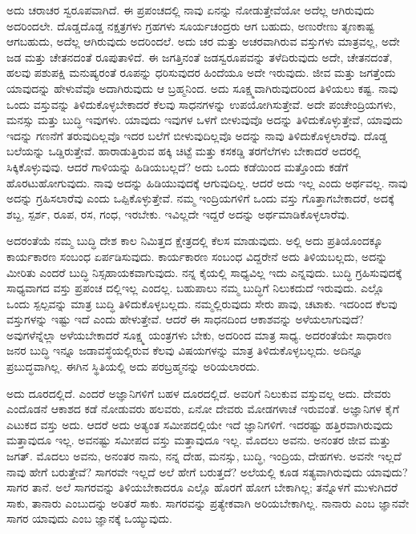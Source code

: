 ಅದು ಚರಾಚರ ಸ್ವರೂಪವಾಗಿದೆ. ಈ ಪ್ರಪಂಚದಲ್ಲಿ ನಾವು ಏನನ್ನು ನೋಡುತ್ತೇವೆಯೋ ಅದೆಲ್ಲ ಆಗಿರುವುದು ಅದರಿಂದಲೇ. ದೊಡ್ಡದೊಡ್ಡ ನಕ್ಷತ್ರಗಳು ಗ್ರಹಗಳು ಸೂರ್ಯಚಂದ್ರರು ಆಗ ಬಹುದು, ಅಣುರೇಣು ತೃಣಕಾಷ್ಟ ಆಗಬಹುದು, ಅದೆಲ್ಲ ಆಗಿರುವುದು ಅದರಿಂದಲೆ. ಅದು ಚರ ಮತ್ತು ಅಚರವಾಗಿರುವ ವಸ್ತುಗಳು ಮಾತ್ರವಲ್ಲ, ಅದೇ ಜಡ ಮತ್ತು ಚೇತನದಂತೆ ರೂಪುತಾಳಿದೆ. ಈ ಜಗತ್ತಿನಂತೆ ಜಡಸ್ವರೂಪವನ್ನು ತಳೆದಿರುವುದು ಅದೇ, ಚೇತನದಂತೆ, ಹಲವು ಪಶುಪಕ್ಷಿ ಮನುಷ್ಯರಂತೆ ರೂಪನ್ನು ಧರಿಸುವುದರ ಹಿಂದೆಯೂ ಅದೇ ಇರುವುದು. ಜೀವ ಮತ್ತು ಜಗತ್ತೆಂದು ಯಾವುದನ್ನು ಹೇಳುವೆವೊ ಅದಾಗಿರುವುದು ಆ ಬ್ರಹ್ಮನಿಂದ. ಅದು ಸೂಕ್ಷ್ಮವಾಗಿರುವುದರಿಂದ ತಿಳಿಯಲು ಕಷ್ಟ. ನಾವು ಒಂದು ವಸ್ತುವನ್ನು ತಿಳಿದುಕೊಳ್ಳಬೇಕಾದರೆ ಕೆಲವು ಸಾಧನಗಳನ್ನು ಉಪಯೋಗಿಸುತ್ತೇವೆ. ಅದೇ ಪಂಚೇಂದ್ರಿಯಗಳು, ಮನಸ್ಸು ಮತ್ತು ಬುದ್ಧಿ ಇವುಗಳು. ಯಾವುದು ಇವುಗಳ ಒಳಗೆ ಬೀಳುವುವೊ ಅದನ್ನು ತಿಳಿದುಕೊಳ್ಳುತ್ತೇವೆ, ಯಾವುದು ಇದನ್ನು ಗಣನೆಗೆ ತರುವುದಿಲ್ಲವೊ ಇದರ ಬಲೆಗೆ ಬೀಳುವುದಿಲ್ಲವೊ ಅದನ್ನು ನಾವು ತಿಳಿದುಕೊಳ್ಳಲಾರೆವು. ದೊಡ್ಡ ಬಲೆಯನ್ನು ಒಡ್ಡಿರುತ್ತೇವೆ. ಹಾರಾಡುತ್ತಿರುವ ಹಕ್ಕಿ ಚಿಟ್ಟೆ ಮತ್ತು ಕಸಕಡ್ಡಿ ತರಗೆಲೆಗಳು ಬೇಕಾದರೆ ಅದರಲ್ಲಿ ಸಿಕ್ಕಿಕೊಳ್ಳುವುವು. ಆದರೆ ಗಾಳಿಯನ್ನು ಹಿಡಿಯಬಲ್ಲದೆ? ಅದು ಒಂದು ಕಡೆಯಿಂದ ಮತ್ತೊಂದು ಕಡೆಗೆ ಹೊರಟುಹೋಗುವುದು. ನಾವು ಅದನ್ನು ಹಿಡಿಯುವುದಕ್ಕೆ ಆಗುವುದಿಲ್ಲ. ಆದರೆ ಅದು ಇಲ್ಲ ಎಂದು ಅರ್ಥವಲ್ಲ. ನಾವು ಅದನ್ನು ಗ್ರಹಿಸಲಾರೆವು ಎಂದು ಒಪ್ಪಿಕೊಳ್ಳುತ್ತೇವೆ. ನಮ್ಮ ಇಂದ್ರಿಯಗಳಿಗೆ ಒಂದು ವಸ್ತು ಗೊತ್ತಾಗಬೇಕಾದರೆ, ಅದಕ್ಕೆ ಶಬ್ದ, ಸ್ಪರ್ಶ, ರೂಪ, ರಸ, ಗಂಧ, ಇರಬೇಕು. ಇವಿಲ್ಲದೇ ಇದ್ದರೆ ಅದನ್ನು ಅರ್ಥಮಾಡಿಕೊಳ್ಳಲಾರೆವು.

ಅದರಂತೆಯೆ ನಮ್ಮ ಬುದ್ಧಿ ದೇಶ ಕಾಲ ನಿಮಿತ್ತದ ಕ್ಷೇತ್ರದಲ್ಲಿ ಕೆಲಸ ಮಾಡುವುದು. ಅಲ್ಲಿ ಅದು ಪ್ರತಿಯೊಂದಕ್ಕೂ ಕಾರ್ಯಕಾರಣ ಸಂಬಂಧ ಏರ್ಪಡಿಸುವುದು. ಕಾರ್ಯಕಾರಣ ಸಂಬಂಧ ವಿದ್ದರೇನೆ ಅದು ತಿಳಿಯಬಲ್ಲದು, ಅದನ್ನು ಮೀರಿತು ಎಂದರೆ ಬುದ್ಧಿ ನಿಸ್ಸಹಾಯಕವಾಗುವುದು. ನನ್ನ ಕೈಯಲ್ಲಿ ಸಾಧ್ಯವಿಲ್ಲ ಇದು ಎನ್ನವುದು. ಬುದ್ಧಿ ಗ್ರಹಿಸುವುದಕ್ಕೆ ಸಾಧ್ಯವಾಗದ ವಸ್ತು ಪ್ರಪಂಚ ದಲ್ಲಿಇಲ್ಲ ಎಂದಲ್ಲ. ಬಹುಪಾಲು ನಮ್ಮ ಬುದ್ಧಿಗೆ ನಿಲುಕದುದೆ ಇರುವುದು. ಎಲ್ಲೊ ಒಂದು ಸ್ಪಲ್ಪವನ್ನು ಮಾತ್ರ ಬುದ್ಧಿ ತಿಳಿದುಕೊಳ್ಳಬಲ್ಲದು. ನಮ್ಮಲ್ಲಿರುವುದು ಸೇರು ಪಾವು, ಚಟಾಕು. ಇದರಿಂದ ಕೆಲವು ವಸ್ತುಗಳನ್ನು ಇಷ್ಟು ಇದೆ ಎಂದು ಹೇಳುತ್ತೇವೆ. ಆದರೆ ಈ ಸಾಧನದಿಂದ ಆಕಾಶವನ್ನು ಅಳೆಯಲಾಗುವುದೆ? ಅವುಗಳೆನ್ನೆಲ್ಲಾ ಅಳೆಯಬೇಕಾದರೆ ಸೂಕ್ಷ್ಮ ಯಂತ್ರಗಳು ಬೇಕು, ಅದರಿಂದ ಮಾತ್ರ ಸಾಧ್ಯ. ಅದರಂತೆಯೇ ಸಾಧಾರಣ ಜನರ ಬುದ್ಧಿ ಇನ್ನೂ ಜಡಾವಸ್ಥೆಯಲ್ಲಿರುವ ಕೆಲವು ವಿಷಯಗಳನ್ನು ಮಾತ್ರ ತಿಳಿದುಕೊಳ್ಳಬಲ್ಲದು. ಅದಿನ್ನೂ ಪ್ರಬುದ್ಧವಾಗಿಲ್ಲ. ಈಗಿನ ಸ್ಥಿತಿಯಲ್ಲಿ ಅದು ಪರಬ್ರಹ್ಮನನ್ನು ಅರಿಯಲಾರದು.

ಅದು ದೂರದಲ್ಲಿದೆ. ಎಂದರೆ ಅಜ್ಞಾನಿಗಳಿಗೆ ಬಹಳ ದೂರದಲ್ಲಿದೆ. ಅವರಿಗೆ ನಿಲುಕುವ ವಸ್ತುವಲ್ಲ ಅದು. ದೇವರು ಎಂದೊಡನೆ ಆಕಾಶದ ಕಡೆ ನೋಡುವರು ಹಲವರು, ಏನೋ ದೇವರು ಮೋಡಗಳಾಚೆ ಇರುವಂತೆ. ಅಜ್ಞಾನಿಗಳ ಕೈಗೆ ಎಟುಕದ ವಸ್ತು ಅದು. ಆದರೆ ಅದು ಅತ್ಯಂತ ಸಮೀಪದಲ್ಲಿಯೇ ಇದೆ ಜ್ಞಾನಿಗಳಿಗೆ. ಇದರಷ್ಟು ಹತ್ತಿರವಾಗಿರುವುದು ಮತ್ತಾವುದೂ ಇಲ್ಲ. ಅವನಷ್ಟು ಸಮೀಪದ ವಸ್ತು ಮತ್ತಾವುದೂ ಇಲ್ಲ. ಮೊದಲು ಅವನು. ಅನಂತರ ಜೀವ ಮತ್ತು ಜಗತ್. ಮೊದಲು ಅವನು, ಅನಂತರ ನಾನು, ನನ್ನ ದೇಹ, ಮನಸ್ಸು, ಬುದ್ಧಿ, ಇಂದ್ರಿಯ, ದೇಹಗಳು. ಅವನೇ ಇಲ್ಲದೆ ನಾವು ಹೇಗೆ ಬರುತ್ತೇವೆ? ಸಾಗರವೇ ಇಲ್ಲದೆ ಅಲೆ ಹೇಗೆ ಬರುತ್ತದೆ? ಅಲೆಯಲ್ಲಿ ಕೂಡ ಸತ್ಯವಾಗಿರುವುದು ಯಾವುದು? ಸಾಗರ ತಾನೆ. ಅಲೆ ಸಾಗರವನ್ನು ತಿಳಿಯಬೇಕಾದರೂ ಎಲ್ಲೊ ಹೊರಗೆ ಹೋಗ ಬೇಕಾಗಿಲ್ಲ; ತನ್ನೊಳಗೆ ಮುಳುಗಿದರೆ ಸಾಕು, ತಾನಾರು ಎಂಬುದನ್ನು ಅರಿತರೆ ಸಾಕು. ಸಾಗರವನ್ನು ಪ್ರತ್ಯೇಕವಾಗಿ ಅರಿಯಬೇಕಾಗಿಲ್ಲ. ನಾನಾರು ಎಂಬ ಜ್ಞಾನವೇ ಸಾಗರ ಯಾವುದು ಎಂಬ ಜ್ಞಾನಕ್ಕೆ ಒಯ್ಯುವುದು.

